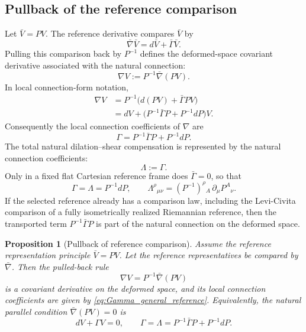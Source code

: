 \documentclass[12pt]{amsart}
\newtheorem{proposition}[theorem]{Proposition}
\theoremstyle{definition}
\theoremstyle{remark}
\begin{document}
\subsection{Pullback of the reference comparison}\label{subsec:DS_compensation}

Let \(\bar V=PV\).  The reference derivative compares \(\bar V\) by
\[
 \bar\nabla \bar V=d\bar V+\bar\Gamma\bar V .
\]
Pulling this comparison back by \(P^{-1}\) defines the deformed-space covariant derivative associated with the natural connection:
\begin{equation}\label{eq:natural_connection_main}
 \nabla V:=P^{-1}\bar\nabla(PV).
\end{equation}
In local connection-form notation,
\begin{align}\label{eq:pullback_total_connection}
 \nabla V
 &=P^{-1}\bigl(d(PV)+\bar\Gamma PV\bigr)\nonumber\\
 &=dV+\bigl(P^{-1}\bar\Gamma P+P^{-1}dP\bigr)V.
\end{align}
Consequently the local connection coefficients of \(\nabla\) are
\begin{equation}\label{eq:Gamma_general_reference}
 \Gamma=P^{-1}\bar\Gamma P+P^{-1}dP.
\end{equation}
The total natural dilation--shear compensation is represented by the natural connection coefficients:
\begin{equation}\label{eq:Lambda_equals_Gamma_general}
 \Lambda:=\Gamma.
\end{equation}
Only in a fixed flat Cartesian reference frame does \(\bar\Gamma=0\), so that
\begin{equation}\label{eq:Lambda_components_flat}
 \Gamma=\Lambda=P^{-1}dP,
 \qquad
 \Lambda^{\rho}{}_{\mu\nu}
 =(P^{-1})^{\rho}{}_{A}\,\partial_\mu P^{A}{}_{\nu}.
\end{equation}
If the selected reference already has a comparison law, including the Levi-Civita comparison of a fully isometrically realized Riemannian reference, then the transported term \(P^{-1}\bar\Gamma P\) is part of the natural connection on the deformed space.

\begin{proposition}[Pullback of reference comparison]\label{prop:pullback_reference_comparison}
Assume the reference representation principle \(\bar V=PV\).  Let the reference representatives be compared by \(\bar\nabla\).  Then the pulled-back rule
\[
 \nabla V=P^{-1}\bar\nabla(PV)
\]
is a covariant derivative on the deformed space, and its local connection coefficients are given by \eqref{eq:Gamma_general_reference}.  Equivalently, the natural parallel condition \(\bar\nabla(PV)=0\) is
\begin{equation}\label{eq:reference_zero_equiv_deformed_zero}
 dV+\Gamma V=0,
 \qquad
 \Gamma=\Lambda=P^{-1}\bar\Gamma P+P^{-1}dP.
\end{equation}
\end{proposition}
\end{document}
